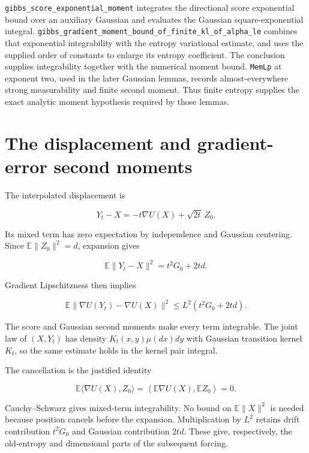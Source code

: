 \documentclass[11pt,a4paper]{report}
\begin{document}
\begin{leanbox}
\texttt{gibbs\_\allowbreak{}score\_\allowbreak{}exponential\_\allowbreak{}moment} integrates the directional score exponential bound over an auxiliary Gaussian and evaluates the Gaussian square-exponential integral. \texttt{gibbs\_\allowbreak{}gradient\_\allowbreak{}moment\_\allowbreak{}bound\_\allowbreak{}of\_\allowbreak{}finite\_\allowbreak{}kl\_\allowbreak{}of\_\allowbreak{}alpha\_\allowbreak{}le} combines that exponential integrability with the entropy variational estimate, and uses the supplied order of constants to enlarge its entropy coefficient. The conclusion supplies integrability together with the numerical moment bound. \texttt{Mem\allowbreak{}Lp} at exponent two, used in the later Gaussian lemmas, records almost-everywhere strong measurability and finite second moment. Thus finite entropy supplies the exact analytic moment hypothesis required by those lemmas.
\end{leanbox}
\section{\texorpdfstring{The displacement and gradient-error second moments}{The displacement and gradient-error second moments}}


The interpolated displacement is

\[Y_t-X=-t\nabla U(X)+\sqrt{2t}\,Z_0.\]

Its mixed term has zero expectation by independence and Gaussian centering. Since \(\mathbb E\|Z_0\|^2=d\), expansion gives

\[\mathbb E\|Y_t-X\|^2=t^2G_0+2td.\]

Gradient Lipschitzness then implies

\[\mathbb E\|\nabla U(Y_t)-\nabla U(X)\|^2
\le L^2(t^2G_0+2td).\]

The score and Gaussian second moments make every term integrable. The joint law of \((X,Y_t)\) has density \(K_t(x,y)\mu(dx)dy\) with Gaussian transition kernel \(K_t\), so the same estimate holds in the kernel pair integral.



The cancellation is the justified identity

\[\mathbb E\langle\nabla U(X),Z_0\rangle
=\left\langle\mathbb E\nabla U(X),\mathbb EZ_0\right\rangle=0.\]

Cauchy–Schwarz gives mixed-term integrability. No bound on \(\mathbb E\|X\|^2\) is needed because position cancels before the expansion. Multiplication by \(L^2\) retains drift contribution \(t^2G_0\) and Gaussian contribution \(2td\). These give, respectively, the old-entropy and dimensional parts of the subsequent forcing.
\end{document}
